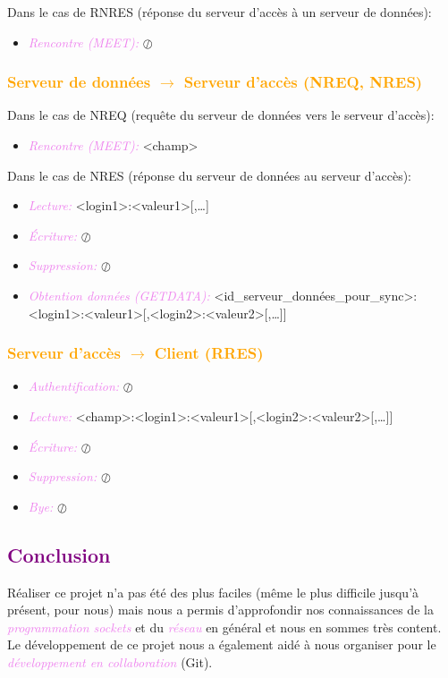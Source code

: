 \documentclass[a4paper]{article}
\newcommand{\ra}{\rightarrow}
\let\oldsection\section{}
\renewcommand{\section}[1]{\textcolor{purple}{\oldsection{#1}}}
\let\oldsubsubsection\subsubsection{}
\renewcommand{\subsubsection}[1]{\textcolor{orange}{\oldsubsubsection{#1}}}
\let\oldtextit\textit
\renewcommand{\textit}[1]{\textcolor{violet}{\oldtextit{#1}}}
\begin{document}
Dans le cas de RNRES (réponse du serveur d'accès à un serveur de données):
\begin{itemize}
    \item \textit{Rencontre (MEET):} $\oslash$
\end{itemize}

\subsubsection{Serveur de données $\ra$ Serveur d'accès (NREQ, NRES)}

Dans le cas de NREQ (requête du serveur de données vers le serveur d'accès):
\begin{itemize}
    \item \textit{Rencontre (MEET):} <champ>
\end{itemize}

Dans le cas de NRES (réponse du serveur de données au serveur d'accès):
\begin{itemize}
    \item \textit{Lecture:} <login1>:<valeur1>[,\ldots]
    \item \textit{Écriture:} $\oslash$
    \item \textit{Suppression:} $\oslash$
    \item \textit{Obtention données (GETDATA):} <id\_serveur\_données\_pour\_sync>:<login1>:<valeur1>[,<login2>:<valeur2>[,\ldots]]
\end{itemize}

\subsubsection{Serveur d'accès $\ra$ Client (RRES)}

\begin{itemize}
    \item \textit{Authentification:} $\oslash$
    \item \textit{Lecture:} <champ>:<login1>:<valeur1>[,<login2>:<valeur2>[,\ldots]]
    \item \textit{Écriture:} $\oslash$
    \item \textit{Suppression:} $\oslash$
    \item \textit{Bye:} $\oslash$
\end{itemize}

\section{Conclusion}

Réaliser ce projet n'a pas été des plus faciles (même le plus difficile jusqu'à présent, pour nous) mais nous a permis d'approfondir nos connaissances de la \textit{programmation sockets} et du \textit{réseau} en général et nous en sommes très content. Le développement de ce projet nous a également aidé à nous organiser pour le \textit{développement en collaboration} (Git).
\end{document}
